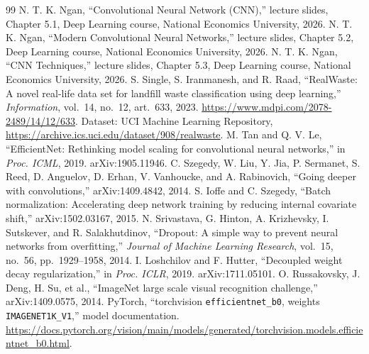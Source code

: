 \documentclass{article}
\begin{document}
\begin{thebibliography}{99}
\setlength{\itemsep}{2pt}
 N. T. K. Ngan, ``Convolutional Neural Network (CNN),'' lecture slides, Chapter 5.1, Deep Learning course, National Economics University, 2026.
 N. T. K. Ngan, ``Modern Convolutional Neural Networks,'' lecture slides, Chapter 5.2, Deep Learning course, National Economics University, 2026.
 N. T. K. Ngan, ``CNN Techniques,'' lecture slides, Chapter 5.3, Deep Learning course, National Economics University, 2026.
 S. Single, S. Iranmanesh, and R. Raad, ``RealWaste: A novel real-life data set for landfill waste classification using deep learning,'' \emph{Information}, vol.~14, no.~12, art.~633, 2023. \url{https://www.mdpi.com/2078-2489/14/12/633}. Dataset: UCI Machine Learning Repository, \url{https://archive.ics.uci.edu/dataset/908/realwaste}.
 M. Tan and Q. V. Le, ``EfficientNet: Rethinking model scaling for convolutional neural networks,'' in \emph{Proc. ICML}, 2019. arXiv:1905.11946.
 C. Szegedy, W. Liu, Y. Jia, P. Sermanet, S. Reed, D. Anguelov, D. Erhan, V. Vanhoucke, and A. Rabinovich, ``Going deeper with convolutions,'' arXiv:1409.4842, 2014.
 S. Ioffe and C. Szegedy, ``Batch normalization: Accelerating deep network training by reducing internal covariate shift,'' arXiv:1502.03167, 2015.
 N. Srivastava, G. Hinton, A. Krizhevsky, I. Sutskever, and R. Salakhutdinov, ``Dropout: A simple way to prevent neural networks from overfitting,'' \emph{Journal of Machine Learning Research}, vol.~15, no.~56, pp.~1929--1958, 2014.
 I. Loshchilov and F. Hutter, ``Decoupled weight decay regularization,'' in \emph{Proc. ICLR}, 2019. arXiv:1711.05101.
 O. Russakovsky, J. Deng, H. Su, et al., ``ImageNet large scale visual recognition challenge,'' arXiv:1409.0575, 2014.
 PyTorch, ``torchvision \texttt{efficientnet\_b0}, weights \texttt{IMAGENET1K\_V1},'' model documentation. \url{https://docs.pytorch.org/vision/main/models/generated/torchvision.models.efficientnet_b0.html}.
\end{thebibliography}
\end{document}
